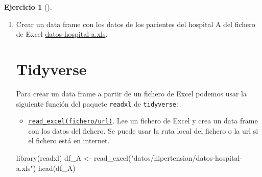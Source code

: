\documentclass[
  a4paper,
]{scrreport}
\newenvironment{Shaded}{\begin{snugshade}}{\end{snugshade}}
\newcommand{\FunctionTok}[1]{\textcolor[rgb]{0.28,0.35,0.67}{#1}}
\newcommand{\NormalTok}[1]{\textcolor[rgb]{0.00,0.23,0.31}{#1}}
\newcommand{\OtherTok}[1]{\textcolor[rgb]{0.00,0.23,0.31}{#1}}
\newcommand{\StringTok}[1]{\textcolor[rgb]{0.13,0.47,0.30}{#1}}
\providecommand{\tightlist}{%
  \setlength{\itemsep}{0pt}\setlength{\parskip}{0pt}}\usepackage{longtable,booktabs,array}
\theoremstyle{definition}
\newtheorem{exercise}{Ejercicio}[chapter]
\theoremstyle{remark}
\begin{document}
\begin{exercise}[]
\begin{enumerate}
\def\labelenumi{\alph{enumi}.}
\item
  Crear un data frame con los datos de los pacientes del hospital A del
  fichero de Excel
  \href{datos/hipertension/datos-hospital-a.xls}{datos-hospital-a.xls}.

  \begin{tcolorbox}[enhanced jigsaw, colframe=quarto-callout-tip-color-frame, toprule=.15mm, bottomtitle=1mm, breakable, opacitybacktitle=0.6, toptitle=1mm, colback=white, bottomrule=.15mm, title=\textcolor{quarto-callout-tip-color}{\faLightbulb}\hspace{0.5em}{Solución}, arc=.35mm, left=2mm, titlerule=0mm, rightrule=.15mm, coltitle=black, leftrule=.75mm, opacityback=0, colbacktitle=quarto-callout-tip-color!10!white]

  \section{Tidyverse}

  Para crear un data frame a partir de un fichero de Excel podemos usar
  la siguiente función del paquete \texttt{readxl} de
  \texttt{tidyverse}:

  \begin{itemize}
  \tightlist
  \item
    \href{https://readxl.tidyverse.org/reference/read_excel.html}{\texttt{read\_excel(fichero/url)}}.
    Lee un fichero de Excel y crea un data frame con los datos del
    fichero. Se puede usar la ruta local del fichero o la url si el
    fichero está en internet.
  \end{itemize}

\begin{Shaded}
\begin{Highlighting}[]
\FunctionTok{library}\NormalTok{(readxl)}
\NormalTok{df\_A }\OtherTok{\textless{}{-}} \FunctionTok{read\_excel}\NormalTok{(}\StringTok{"datos/hipertension/datos{-}hospital{-}a.xls"}\NormalTok{)}
\FunctionTok{head}\NormalTok{(df\_A)}
\end{Highlighting}
\end{Shaded}


\end{tcolorbox}
\end{enumerate}
\end{exercise}
\end{document}
